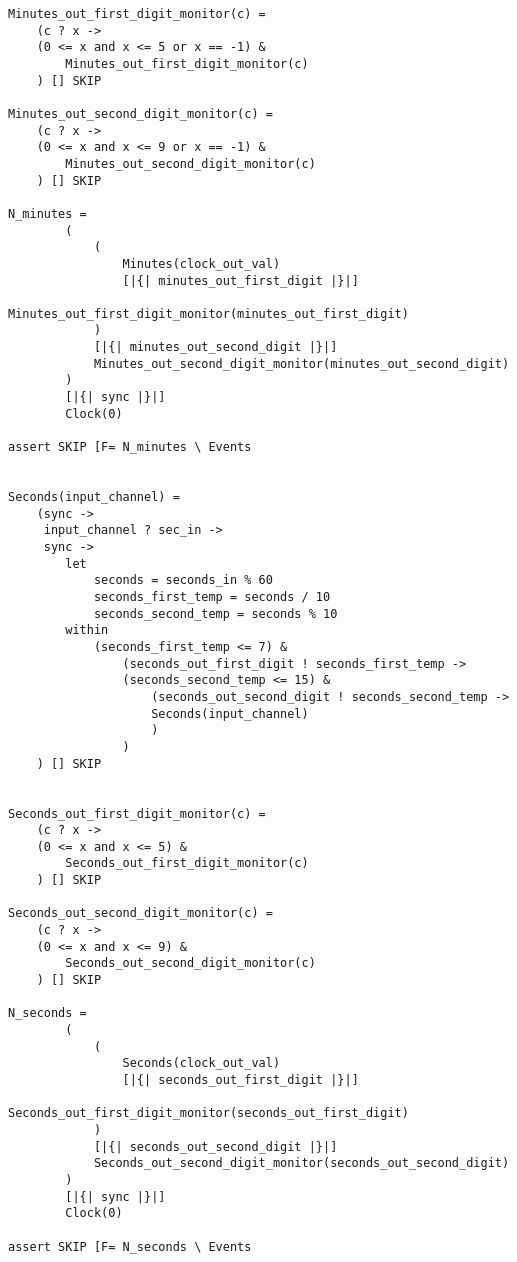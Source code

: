 \begin{verbatim}
Minutes_out_first_digit_monitor(c) =
    (c ? x ->
    (0 <= x and x <= 5 or x == -1) &
        Minutes_out_first_digit_monitor(c)
    ) [] SKIP

Minutes_out_second_digit_monitor(c) =
    (c ? x ->
    (0 <= x and x <= 9 or x == -1) &
        Minutes_out_second_digit_monitor(c)
    ) [] SKIP

N_minutes =
        (
            (
                Minutes(clock_out_val)
                [|{| minutes_out_first_digit |}|]
                Minutes_out_first_digit_monitor(minutes_out_first_digit)
            )
            [|{| minutes_out_second_digit |}|]
            Minutes_out_second_digit_monitor(minutes_out_second_digit)
        )
        [|{| sync |}|]
        Clock(0)

assert SKIP [F= N_minutes \ Events


Seconds(input_channel) =
    (sync ->
     input_channel ? sec_in ->
     sync ->
        let
            seconds = seconds_in % 60
            seconds_first_temp = seconds / 10
            seconds_second_temp = seconds % 10
        within
            (seconds_first_temp <= 7) &
                (seconds_out_first_digit ! seconds_first_temp ->
                (seconds_second_temp <= 15) &
                    (seconds_out_second_digit ! seconds_second_temp ->
                    Seconds(input_channel)
                    )
                )
    ) [] SKIP


Seconds_out_first_digit_monitor(c) =
    (c ? x ->
    (0 <= x and x <= 5) &
        Seconds_out_first_digit_monitor(c)
    ) [] SKIP

Seconds_out_second_digit_monitor(c) =
    (c ? x ->
    (0 <= x and x <= 9) &
        Seconds_out_second_digit_monitor(c)
    ) [] SKIP

N_seconds =
        (
            (
                Seconds(clock_out_val)
                [|{| seconds_out_first_digit |}|]
                Seconds_out_first_digit_monitor(seconds_out_first_digit)
            )
            [|{| seconds_out_second_digit |}|]
            Seconds_out_second_digit_monitor(seconds_out_second_digit)
        )
        [|{| sync |}|]
        Clock(0)

assert SKIP [F= N_seconds \ Events
\end{verbatim}


